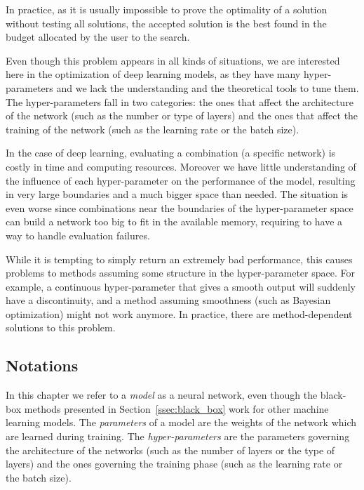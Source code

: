 In practice, as it is usually impossible to prove the optimality of a solution without testing all solutions, the accepted solution is the best found in the budget allocated by the user to the search.

Even though this problem appears in all kinds of situations, we are interested here in the optimization of deep learning models, as they have many hyper-parameters and we lack the understanding and the theoretical tools to tune them. The hyper-parameters fall in two categories: the ones that affect the architecture of the network (such as the number or type of layers) and the ones that affect the training of the network (such as the learning rate or the batch size).

In the case of deep learning, evaluating a combination (a specific network) is costly in time and computing resources. Moreover we have little understanding of the influence of each hyper-parameter on the performance of the model, resulting in very large boundaries and a much bigger space than needed. The situation is even worse since combinations near the boundaries of the hyper-parameter space can build a network too big to fit in the available memory, requiring to have a way to handle evaluation failures. 

While it is tempting to simply return an extremely bad performance, this causes problems to methods assuming some structure in the hyper-parameter space. For example, a continuous hyper-parameter that gives a smooth output will suddenly have a discontinuity, and a method assuming smoothness (such as Bayesian optimization) might not work anymore. In practice, there are method-dependent solutions to this problem. 

\subsection{Notations}
\label{ssec:notation}

In this chapter we refer to a \textit{model} as a neural network, even though the black-box methods presented in Section~\ref{ssec:black_box} work for other machine learning models. The \textit{parameters} of a model are the weights of the network which are learned during training. The \textit{hyper-parameters} are the parameters governing the architecture of the networks (such as the number of layers or the type of layers) and the ones governing the training phase (such as the learning rate or the batch size). 

